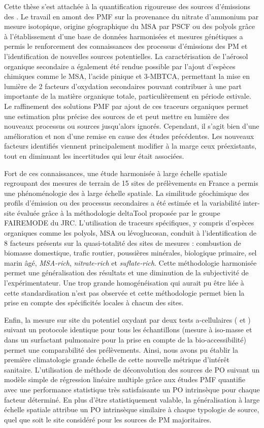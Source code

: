 Cette thèse s'est attachée à la quantification rigoureuse des sources d'émissions des \PMdix.
Le travail en amont des PMF sur la provenance du nitrate d'ammonium par mesure
isotopique, origine géographique du MSA par PSCF ou des polyols grâce à l'établissement
d'une base de données harmonisées et mesures génétiques a permis le renforcement des
connaissances des processus d'émissions des PM et l'identification de nouvelles sources
potentielles.
La caractérisation de l'aérosol organique secondaire a également été rendue possible par
l'ajout d'espèces chimiques comme le MSA, l'acide pinique et 3-MBTCA, permettant la mise
en lumière de 2 facteurs d'oxydation secondaires pouvant contribuer à une part importante
de la matière organique totale, particulièrement en période estivale.
Le raffinement des solutions PMF par ajout de ces traceurs organiques permet une
estimation plus précise des sources de \PMdix{} et peut mettre en lumière des nouveaux
processus ou sources jusqu'alors ignorés.
Cependant, il s'agit bien d'une amélioration et non d'une remise en cause des études
précédentes. Les nouveaux facteurs identifiés viennent principalement modifier à la marge ceux
préexistants, tout en diminuant les incertitudes qui leur était associées.

Fort de ces connaissances, une étude harmonisée à large échelle spatiale regroupant des
mesures de terrain de 15 sites de prélèvements en France a permis une phénoménologie des
\PMdix{} à large échelle spatiale. La similitude géochimique des profils d'émission ou
des processus secondaires a été estimée et la variabilité inter-site évaluée grâce
à la méthodologie deltaTool proposée par le groupe FAIREMODE du JRC. L'utilisation de traceurs
spécifiques, y compris d'espèces organiques comme les polyols, MSA ou lévoglucosan,
conduit à l'identification de 8 facteurs présents sur la quasi-totalité des sites de
mesures : combustion de biomasse domestique, trafic routier, poussières minérales,
biologique primaire, sel marin âgé, \textit{MSA-rich}, \textit{nitrate-rich} et \textit{suflate-rich}.
Cette méthodologie harmonisée permet une généralisation des résultats et une diminution de
la subjectivité de l'expérimentateur. Une trop grande homogénéisation qui aurait pu être
liée à cette standardisation n'est pas observée et cette méthodologie permet bien la prise
en compte des spécificités locales à chacun des sites.

Enfin, la mesure sur site du potentiel oxydant par deux tests a-cellulaires (\POAA{} et
\PODTT) suivant un protocole identique pour tous les échantillons (mesure à iso-masse et
dans un surfactant pulmonaire pour la prise en compte de la bio-accessibilité) permet une
comparabilité des prélèvements. Ainsi, nous avons pu établir la première climatologie grande échelle
de cette nouvelle métrique d'intérêt sanitaire.
L'utilisation de méthode de déconvolution des sources de PO suivant un modèle simple de
régression linéaire multiple grâce aux études PMF quantifie avec une performance
statistique très satisfaisante un PO intrinsèque pour chaque facteur déterminé.
En plus d'être statistiquement valable, la généralisation à large échelle spatiale
attribue un PO intrinsèque similaire à chaque typologie de source, quel que soit le site
considéré pour les sources de PM majoritaires.

